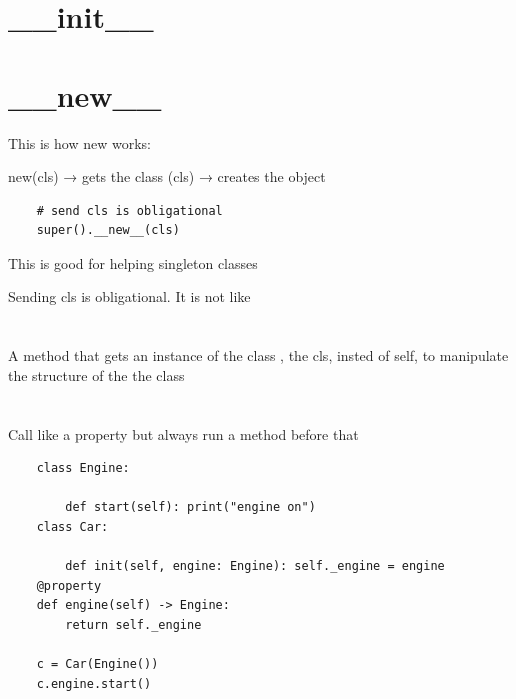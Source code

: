 \section{\_\_init\_\_}

\section{\_\_new\_\_}

This is how new works:

new(cls) → gets the class (cls) → creates the object

\begin{verbatim}
    # send cls is obligational
    super().__new__(cls)
\end{verbatim}

This is good for helping singleton classes


Sending cls is obligational. It is not like

\section{\@classmethod}

A method that gets an instance of the class , the cls, insted of self, to manipulate the structure of the the class

\section{\@staticmethod}

\section{\@property}

Call like a property but always run a method before that

\begin{verbatim}
    class Engine:

        def start(self): print("engine on")
    class Car:

        def init(self, engine: Engine): self._engine = engine
    @property
    def engine(self) -> Engine:
        return self._engine

    c = Car(Engine())
    c.engine.start()
\end{verbatim}

\section{\@override}

